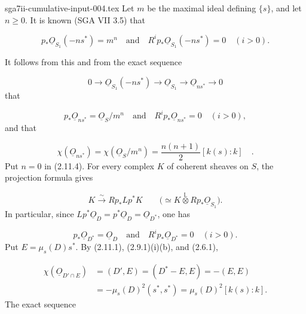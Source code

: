\begin{filecontents*}{sga7ii-cumulative-input-004.tex}
Let $m$ be the maximal ideal defining $\{s\}$, and let $n\geq0$.  It is known
(SGA VII 3.5) that

\begin{equation}\tag{2.11.4}
p_*\underline{O}_{S_1}(-ns^*)=m^n
\quad\text{and}\quad
R^ip_*\underline{O}_{S_1}(-ns^*)=0\quad(i>0).
\end{equation}


It follows from this and from the exact sequence

\begin{equation*}
0\longrightarrow\underline{O}_{S_1}(-ns^*)
\longrightarrow\underline{O}_{S_1}
\longrightarrow\underline{O}_{ns^*}
\longrightarrow0
\end{equation*}
that

\begin{equation}\tag{2.11.5}
p_*\underline{O}_{ns^*}=\underline{O}_S/m^n
\quad\text{and}\quad
R^ip_*\underline{O}_{ns^*}=0\quad(i>0),
\end{equation}
and that

\begin{equation}\tag{2.11.6}
\chi(\underline{O}_{ns^*})
=\chi(\underline{O}_S/m^n)
=\frac{n(n+1)}2[k(s):k] \quad .
\end{equation}
Put $n=0$ in (2.11.4).  For every complex $K$ of coherent sheaves on $S$, the
projection formula gives

\begin{equation*}
K\xrightarrow{\;\sim\;}Rp_*Lp^*K
\qquad
\bigl(\simeq K\overset{\mathbb L}{\otimes}Rp_*\underline{O}_{S_1}\bigr).
\end{equation*}
In particular, since
$Lp^*\underline{O}_D=p^*\underline{O}_D=\underline{O}_{D^*}$, one has

\begin{equation}\tag{2.11.7}
p_*\underline{O}_{D^*}=\underline{O}_D
\quad\text{and}\quad
R^ip_*\underline{O}_{D^*}=0\quad(i>0).
\end{equation}
Put $E=\mu_s(D)s^*$.  By (2.11.1), (2.9.1)(i)(b), and (2.6.1),

\begin{equation}\tag{2.11.8}
\begin{aligned}
\chi(\underline{O}_{D'\cap E})
&=(D',E)=(D^*-E,E)=-(E,E)\\
&=-\mu_s(D)^2(s^*,s^*)
=\mu_s(D)^2[k(s):k].
\end{aligned}
\end{equation}
The exact sequence


\end{filecontents*}
